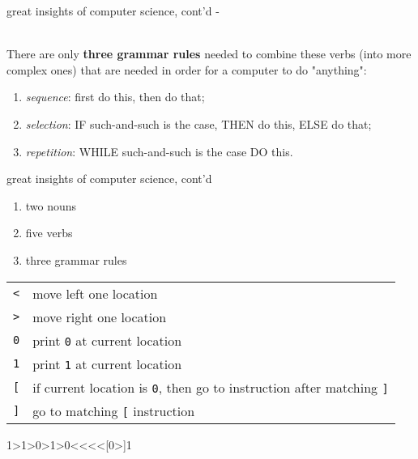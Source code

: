 \documentclass[10pt,t,svgnames]{beamer}
\makeatletter
\newlength\tightleftmargin{}
\newlength\diffleftmargin{}
\providecommand{\nextline}{
  \setlength\labelwidth{\tightleftmargin}
  \setlength\leftmargin{\tightleftmargin}
  \advance\linewidth\diffleftmargin{}
  \advance\@totalleftmargin-\diffleftmargin{}
  \parshape\@ne\@totalleftmargin\linewidth{}
  \setlength\itemsep{1.5ex}
}
\let\origdescription\description
\let\endorigdescription\enddescription
\renewenvironment{description}{\origdescription\nextline}{\endorigdescription}
\makeatother
\begin{document}
  \begin{frame}[c]{great insights of computer science, cont'd}
    \begin{description}
      \item[Boehm and Jacopini] \hfill \\
        There are only \textbf{three grammar rules} needed to combine these
        verbs (into more complex ones) that are needed in order for a computer
        to do "anything":
        \begin{enumerate}
          \item \emph{sequence}: first do this, then do that;
          \item \emph{selection}: IF such-and-such is the case, THEN do this,
            ELSE do that;
          \item \emph{repetition}: WHILE such-and-such is the case DO this.
        \end{enumerate}
    \end{description}
  \end{frame}

  \begin{frame}[fragile]{great insights of computer science, cont'd}
    \begin{enumerate}
      \item two nouns
      \item five verbs
      \item three grammar rules
    \end{enumerate}
    \vspace{\baselineskip}

    \begin{tabular}{l|l}
      \hline
      \texttt{\textless}    & move left one location\\
      \texttt{\textgreater} & move right one location\\
      \texttt{0}            & print \texttt{0} at current location\\
      \texttt{1}            & print \texttt{1} at current location\\
      \texttt{[}            & if current location is \texttt{0}, then go to
                              instruction after matching \texttt{]}\\
      \texttt{]}            & go to matching \texttt{[} instruction\\
      \hline
    \end{tabular}

    \begin{termblock}
    1>1>0>1>0<<<<[0>]1
    \end{termblock}

  \end{frame}
\end{document}

